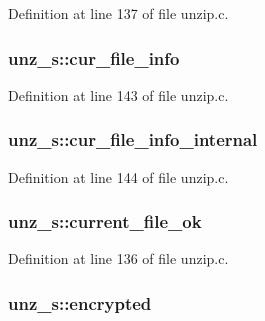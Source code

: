 Definition at line 137 of file unzip.\-c.

\hypertarget{structunz__s_ab1963897ac959ca0f9b4208c573c2795}{
\subsubsection[{cur\-\_\-file\-\_\-info}]{ unz\-\_\-s\-::cur\-\_\-file\-\_\-info}}\label{structunz__s_ab1963897ac959ca0f9b4208c573c2795}


Definition at line 143 of file unzip.\-c.

\hypertarget{structunz__s_a36625697385b9a675f02a446fa5ba583}{
\subsubsection[{cur\-\_\-file\-\_\-info\-\_\-internal}]{ unz\-\_\-s\-::cur\-\_\-file\-\_\-info\-\_\-internal}}\label{structunz__s_a36625697385b9a675f02a446fa5ba583}


Definition at line 144 of file unzip.\-c.

\hypertarget{structunz__s_abe2244ba62db8b3251634e26183f1c9a}{
\subsubsection[{current\-\_\-file\-\_\-ok}]{ unz\-\_\-s\-::current\-\_\-file\-\_\-ok}}\label{structunz__s_abe2244ba62db8b3251634e26183f1c9a}


Definition at line 136 of file unzip.\-c.

\hypertarget{structunz__s_ae50c5145b776e6b2d68a078adbb9ad52}{
\subsubsection[{encrypted}]{ unz\-\_\-s\-::encrypted}}\label{structunz__s_ae50c5145b776e6b2d68a078adbb9ad52}


